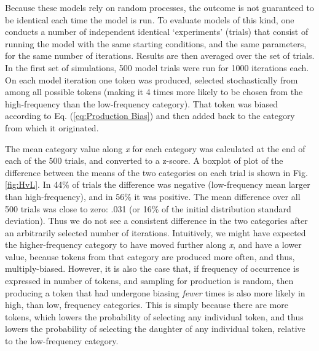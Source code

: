 Because these models rely on random processes, the outcome is not
guaranteed to be identical each time the model is run. To evaluate
models of this kind, one conducts a number of independent identical
`experiments' (trials) that consist of running the model with the
same starting conditions, and the same parameters, for the same number
of iterations. Results are then averaged over the set of trials. In
the first set of simulations, 500 model trials were run for 1000 iterations
each. On each model iteration one token was produced, selected stochastically
from among all possible tokens (making it 4 times more likely to be
chosen from the high-frequency than the low-frequency category). That
token was biased according to Eq. (\ref{eq:Production Bias}) and
then added back to the category from which it originated. 

The mean category value along \emph{x} for each category was calculated
at the end of each of the 500 trials, and converted to a z-score.
A boxplot of plot of the difference between the means of the two categories
on each trial is shown in Fig. \ref{fig:HvL}. In 44\% of trials the
difference was negative (low-frequency mean larger than high-frequency),
and in 56\% it was positive. The mean difference over all 500 trials
was close to zero: .031 (or 16\% of the initial distribution standard
deviation). Thus we do not see a consistent difference in the two
categories after an arbitrarily selected number of iterations. Intuitively,
we might have expected the higher-frequency category to have moved
further along \emph{x}, and have a lower value, because tokens from
that category are produced more often, and thus, multiply-biased.
However, it is also the case that, if frequency of occurrence is expressed
in number of tokens, and sampling for production is random, then producing
a token that had undergone biasing \emph{fewer} times is also more
likely in high, than low, frequency categories. This is simply because
there are more tokens, which lowers the probability of selecting any
individual token, and thus lowers the probability of selecting the
daughter of any individual token, relative to the low-frequency category. 

